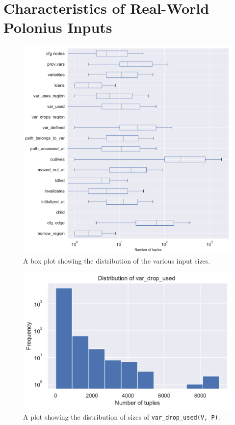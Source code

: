 \documentclass[11pt,a4paper,twoside,openany]{report}
\newcommand{\InDatalog}[1]{\texttt{#1}}
\renewcommand\_{\textunderscore\allowbreak}
\begin{document}
\section{Characteristics of Real-World Polonius Inputs}\label{sec:inputs:inputs}

\begin{figure}
  \includegraphics[width=0.9\linewidth]{Graphs/input_sizes_boxplot.pdf}
  \caption[Distribution of Polonius Input Tuple Sizes]{A box plot showing the
    distribution of the various input sizes.}\label{fig:input-sizes}
\end{figure}

\begin{figure}
  \includegraphics[width=0.5\linewidth]{Graphs/var_drop_used_size_dist.pdf}
  \caption[Distribution of Input Sizes for the \InDatalog{var_drop_used(V, P)}
  Fact]{A plot showing the distribution of sizes of \InDatalog{var_drop_used(V,
      P)}.}\label{fig:input-var-drop-used}
\end{figure}
\end{document}
